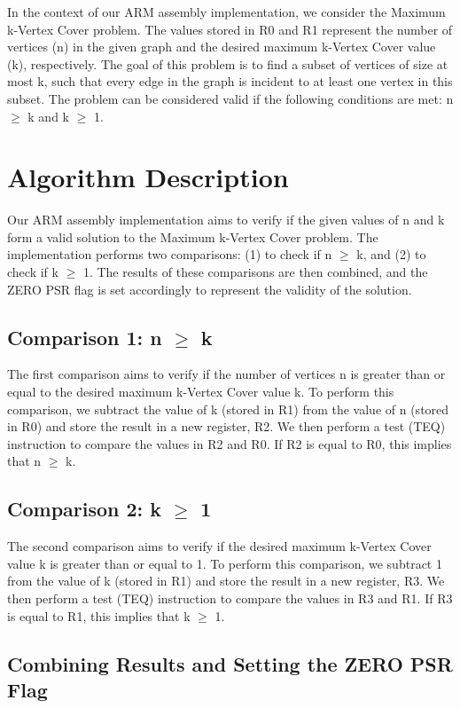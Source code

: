 In the context of our ARM assembly implementation, we consider the Maximum k-Vertex Cover problem. The values stored in R0 and R1 represent the number of vertices (n) in the given graph and the desired maximum k-Vertex Cover value (k), respectively. The goal of this problem is to find a subset of vertices of size at most k, such that every edge in the graph is incident to at least one vertex in this subset. The problem can be considered valid if the following conditions are met: n $\geq$ k and k $\geq$ 1.

\section{Algorithm Description}

Our ARM assembly implementation aims to verify if the given values of n and k form a valid solution to the Maximum k-Vertex Cover problem. The implementation performs two comparisons: (1) to check if n $\geq$ k, and (2) to check if k $\geq$ 1. The results of these comparisons are then combined, and the ZERO PSR flag is set accordingly to represent the validity of the solution.

\subsection{Comparison 1: n $\geq$ k}

The first comparison aims to verify if the number of vertices n is greater than or equal to the desired maximum k-Vertex Cover value k. To perform this comparison, we subtract the value of k (stored in R1) from the value of n (stored in R0) and store the result in a new register, R2. We then perform a test (TEQ) instruction to compare the values in R2 and R0. If R2 is equal to R0, this implies that n $\geq$ k.

\subsection{Comparison 2: k $\geq$ 1}

The second comparison aims to verify if the desired maximum k-Vertex Cover value k is greater than or equal to 1. To perform this comparison, we subtract 1 from the value of k (stored in R1) and store the result in a new register, R3. We then perform a test (TEQ) instruction to compare the values in R3 and R1. If R3 is equal to R1, this implies that k $\geq$ 1.

\subsection{Combining Results and Setting the ZERO PSR Flag}

